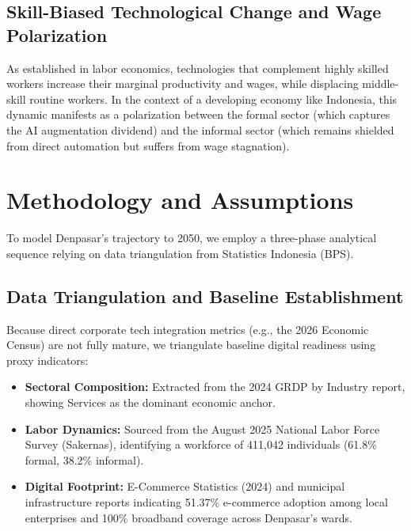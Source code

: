\documentclass[11pt, a4paper]{article}
\begin{document}
  \subsection{Skill-Biased Technological Change and Wage Polarization}
  As established in labor economics, technologies that complement highly skilled workers increase their marginal productivity and wages, while displacing middle-skill routine workers. In the context of a developing economy like Indonesia, this dynamic manifests as a polarization between the formal sector (which captures the AI augmentation dividend) and the informal sector (which remains shielded from direct automation but suffers from wage stagnation).
  
  \section{Methodology and Assumptions}
  To model Denpasar's trajectory to 2050, we employ a three-phase analytical sequence relying on data triangulation from Statistics Indonesia (BPS).

\subsection{Data Triangulation and Baseline Establishment}
Because direct corporate tech integration metrics (e.g., the 2026 Economic Census) are not fully mature, we triangulate baseline digital readiness using proxy indicators:
\begin{itemize}
    \item \textbf{Sectoral Composition:} Extracted from the 2024 GRDP by Industry report, showing Services as the dominant economic anchor.
    \item \textbf{Labor Dynamics:} Sourced from the August 2025 National Labor Force Survey (Sakernas), identifying a workforce of 411,042 individuals (61.8\% formal, 38.2\% informal).
    \item \textbf{Digital Footprint:} E-Commerce Statistics (2024) and municipal infrastructure reports indicating 51.37\% e-commerce adoption among local enterprises and 100\% broadband coverage across Denpasar's wards.
  \end{itemize}
  
\end{document}
